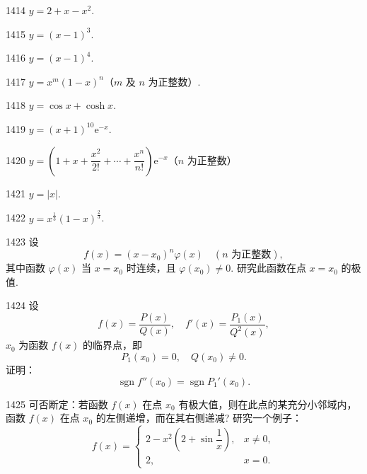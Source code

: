 

\begin{prob}[S]{1414}
$y = 2 + x - x^2$.
\end{prob}

\begin{prob}[S]{1415}
$y = (x - 1)^3$.
\end{prob}

\begin{prob}[S]{1416}
$y = (x - 1)^4$.
\end{prob}

\begin{prob}[S]{1417}
$y = x^m (1 - x)^n$（$m$ 及 $n$ 为正整数）.
\end{prob}

\begin{prob}[S]{1418}
$y = \cos x + \cosh x$.
\end{prob}

\begin{prob}[S]{1419}
$y = (x + 1)^{10} \mathrm{e}^{-x}$.
\end{prob}

\begin{prob}[S]{1420}
$y = \left(1 + x + \dfrac{x^2}{2!} + \cdots + \dfrac{x^n}{n!}\right)\mathrm{e}^{-x}$（$n$ 为正整数）
\end{prob}

\begin{prob}[S]{1421}
$y = |x|$.
\end{prob}

\begin{prob}[S]{1422}
$y = x^{\frac{1}{3}} (1 - x)^{\frac{2}{3}}$.
\end{prob}

\begin{prob}[M]{1423}
设
\[
f(x) = (x - x_0)^n \varphi(x) \quad (n \text{ 为正整数}),
\]
其中函数 $\varphi(x)$ 当 $x = x_0$ 时连续，且 $\varphi(x_0) \neq 0$. 研究此函数在点 $x = x_0$ 的极值.
\end{prob}

\begin{prob}[M]{1424}
设
\[
f(x) = \frac{P(x)}{Q(x)}, \quad f'(x) = \frac{P_1(x)}{Q^2(x)},
\]
$x_0$ 为函数 $f(x)$ 的临界点，即
\[
P_1(x_0) = 0, \quad Q(x_0) \neq 0.
\]
证明：
\[
\operatorname{sgn} f''(x_0) = \operatorname{sgn} P_1'(x_0).
\]
\end{prob}

\begin{prob}[M]{1425}
可否断定：若函数 $f(x)$ 在点 $x_0$ 有极大值，则在此点的某充分小邻域内，函数 $f(x)$ 在点 $x_0$ 的左侧递增，而在其右侧递减? 研究一个例子：
\[
f(x) = \begin{cases}
2 - x^2 \left(2 + \sin\dfrac{1}{x}\right), & x \neq 0, \\
2, & x = 0.
\end{cases}
\]
\end{prob}

